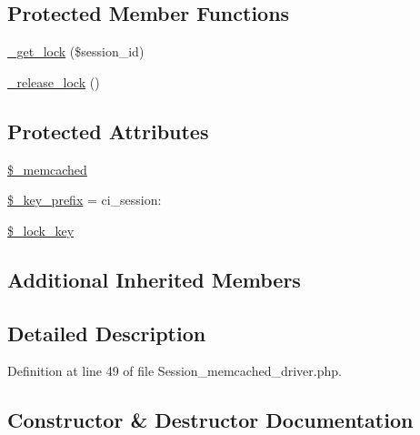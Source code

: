 \subsection*{Protected Member Functions}
\begin{DoxyCompactItemize}
\item 
\mbox{\hyperlink{class_c_i___session__memcached__driver_a2c49c8e23be3e2aca96a9d20de18ffc2}{\+\_\+get\+\_\+lock}} (\$session\+\_\+id)
\item 
\mbox{\hyperlink{class_c_i___session__memcached__driver_a0265e356e6cf1eaba229663c1664c37d}{\+\_\+release\+\_\+lock}} ()
\end{DoxyCompactItemize}
\subsection*{Protected Attributes}
\begin{DoxyCompactItemize}
\item 
\mbox{\hyperlink{class_c_i___session__memcached__driver_a9ce5188201bbc41ed4374947a35dadcc}{\$\+\_\+memcached}}
\item 
\mbox{\hyperlink{class_c_i___session__memcached__driver_a177f231cc2eec31d9aa8f50f9ec9b407}{\$\+\_\+key\+\_\+prefix}} = \textquotesingle{}ci\+\_\+session\+:\textquotesingle{}
\item 
\mbox{\hyperlink{class_c_i___session__memcached__driver_a79bf61cb0768c7bb23404280ae004fb4}{\$\+\_\+lock\+\_\+key}}
\end{DoxyCompactItemize}
\subsection*{Additional Inherited Members}


\subsection{Detailed Description}


Definition at line 49 of file Session\+\_\+memcached\+\_\+driver.\+php.



\subsection{Constructor \& Destructor Documentation}
\mbox{\label{class_c_i___session__memcached__driver_ac1669c73d53d6f16cf5459a1e84d39c8}} 
